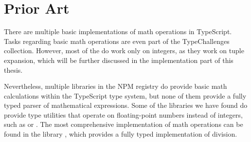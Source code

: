\section{Prior Art}

There are multiple basic implementations of math operations in TypeScript. Tasks regarding basic math operations are even part of the TypeChallenges collection\cite{TypechallengesTypechallenges2023}. However, most of the do work only on integers, as they work on tuple expansion, which will be further discussed in the implementation part of this thesis. 

Nevertheless, multiple libraries in the NPM registry do provide basic math calculations within the TypeScript type system, but none of them provide a fully typed parser of mathematical expressions. Some of the libraries we have found do provide type utilities that operate on floating-point numbers instead of integers, such as  \cite{sorhusSindresorhusTypefest2023} or \cite{kawayilinlinKawayiLinLinTypescriptlodash2023}. The most comprehensive implementation of math operations can be found in the  library \cite{arielTypeLevelArithmetic2023}, which provides a fully typed implementation of division.

